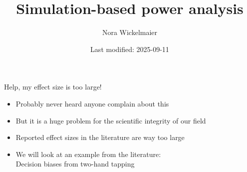 \documentclass[aspectratio=169]{beamer}
\title{Simulation-based power analysis}
\author{Nora Wickelmaier}
\date{Last modified: 2025-09-11}
\begin{document}
\begin{frame}
\thispagestyle{empty}
\titlepage
\end{frame}

\begin{frame}{}%
  \begin{center}\huge{Help, my effect size is too large!}\end{center}
    \vspace{.2cm}
  \pause
  \begin{itemize}
    \item Probably never heard anyone complain about this
    \item But it is a huge problem for the scientific integrity of our field
    \item Reported effect sizes in the literature are way too large\\[4ex]
      \pause
    \item We will look at an example from the literature: \\
     Decision biases from two-hand tapping
  \end{itemize}
  \vfill
\end{frame}
\end{document}
